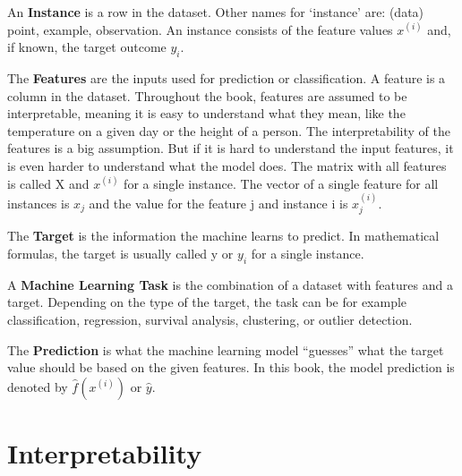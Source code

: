 \documentclass[
  11pt,
]{scrbook}
\begin{document}
An \textbf{Instance} is a row in the dataset.
Other names for `instance' are: (data) point, example, observation.
An instance consists of the feature values \(x^{(i)}\) and, if known, the target outcome \(y_i\).

The \textbf{Features} are the inputs used for prediction or classification.
A feature is a column in the dataset.
Throughout the book, features are assumed to be interpretable, meaning it is easy to understand what they mean, like the temperature on a given day or the height of a person.
The interpretability of the features is a big assumption.
But if it is hard to understand the input features, it is even harder to understand what the model does.
The matrix with all features is called X and \(x^{(i)}\) for a single instance.
The vector of a single feature for all instances is \(x_j\) and the value for the feature j and instance i is \(x^{(i)}_j\).

The \textbf{Target} is the information the machine learns to predict.
In mathematical formulas, the target is usually called y or \(y_i\) for a single instance.

A \textbf{Machine Learning Task} is the combination of a dataset with features and a target.
Depending on the type of the target, the task can be for example classification, regression, survival analysis, clustering, or outlier detection.

The \textbf{Prediction} is what the machine learning model ``guesses'' what the target value should be based on the given features.
In this book, the model prediction is denoted by \(\hat{f}(x^{(i)})\) or \(\hat{y}\).

\hypertarget{interpretability}{%
\chapter{Interpretability}\label{interpretability}}
\end{document}
